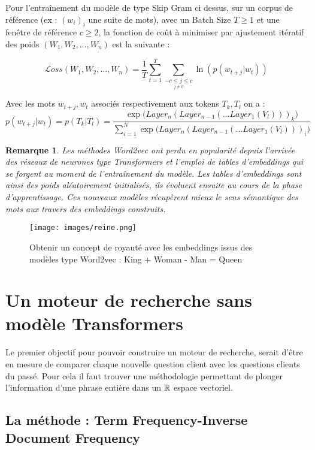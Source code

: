 \documentclass[12pt]{article}
\newtheorem{rmq}{Remarque}
\theoremstyle{definition}
\begin{document}
	Pour l'entraînement du modèle de type Skip Gram ci dessus, sur un corpus  de référence (ex : $(w_i)_i$ une suite de mots), avec un Batch Size  $T \geq 1$ et une fenêtre de référence $c\geq2$, la fonction de coût à minimiser par ajustement itératif des poids $(W_1,W_2,\dots,W_n)$ est la suivante :  
	
	$$\displaystyle\mathcal{L}oss(W_1,W_2,\dots,W_n) = \dfrac{1}{T}\sum_{t=1}^{T}\sum_{\underset{j\neq 0}{-c\leq j \leq c}} \ln(p(w_{t+j}|w_t))$$
	
	\noindent Avec les mots $w_{t+j}, w_{t}$ associés respectivement aux tokens $T_k, T_l$ on a :
	 $$ p(w_{t+j}|w_t) = p(T_k|T_l) = \dfrac{\displaystyle\exp\big(Layer_n(Layer_{n-1}(\dots Layer_1(V_l)))_k\big)}{\displaystyle\sum_{i=1}^{N}\exp\big(Layer_n(Layer_{n-1}(\dots Layer_1(V_l)))_i\big)}$$
	
	
	\begin{rmq}
		Les méthodes Word2vec ont perdu en popularité depuis l'arrivée des réseaux de neurones type Transformers et l'emploi de tables d'embeddings qui se forgent au moment de l'entraînement du modèle. Les tables d'embeddings sont ainsi des poids aléatoirement initialisés, ils évoluent ensuite au cours de la phase d'apprentissage. Ces nouveaux modèles récupèrent mieux le sens sémantique des mots aux travers des embeddings construits. 
	\end{rmq}

		\begin{figure*}[!h]
		\centering
		\texttt{[image: images/reine.png]}
		\caption{Obtenir un concept de royauté avec les embeddings issus des modèles type Word2vec : King + Woman - Man = Queen \cite{Distributed_Representations_of_Words} }
	\end{figure*}
	
	
	\section{Un moteur de recherche sans modèle Transformers}
	
	Le premier objectif pour pouvoir construire un moteur de recherche, serait d'être en mesure de comparer chaque nouvelle question client avec les questions clients du passé. Pour cela il faut trouver une méthodologie permettant de plonger l'information d'une phrase entière dans un $\mathbb{R}$ espace vectoriel. 
	
	
	
	\subsection{La méthode : Term Frequency-Inverse Document Frequency}
	
\end{document}
